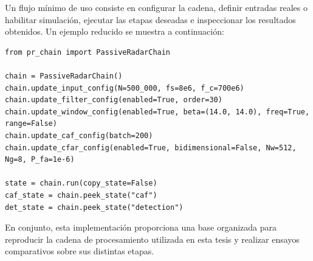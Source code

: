 Un flujo mínimo de uso consiste en configurar la cadena, definir entradas reales o habilitar simulación, ejecutar las etapas deseadas e inspeccionar los resultados obtenidos. Un ejemplo reducido se muestra a continuación:

\begin{Verbatim}[breaklines=true, breakanywhere=true, fontsize=\small]
from pr_chain import PassiveRadarChain

chain = PassiveRadarChain()
chain.update_input_config(N=500_000, fs=8e6, f_c=700e6)
chain.update_filter_config(enabled=True, order=30)
chain.update_window_config(enabled=True, beta=(14.0, 14.0), freq=True, range=False)
chain.update_caf_config(batch=200)
chain.update_cfar_config(enabled=True, bidimensional=False, Nw=512, Ng=8, P_fa=1e-6)

state = chain.run(copy_state=False)
caf_state = chain.peek_state("caf")
det_state = chain.peek_state("detection")
\end{Verbatim}

En conjunto, esta implementación proporciona una base organizada para reproducir la cadena de procesamiento utilizada en esta tesis y realizar ensayos comparativos sobre sus distintas etapas.
